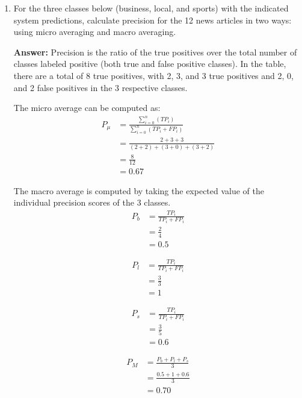 \documentclass[11pt]{article}
\begin{document}
\begin{enumerate}
\begin{enumerate}
          \item For the three classes below (business, local, and sports) with the indicated system predictions, calculate precision for the 12 news articles in two ways: using micro averaging and macro averaging.

                \textbf{Answer:} Precision is the ratio of the true positives over the total number of classes labeled positive (both true and false positive classes). In the table, there are a total of 8 true positives, with 2, 3, and 3 true positives and 2, 0, and 2 false positives in the 3 respective classes.

                The micro average can be computed as:
                \begin{align*}
                  P_{\mu} & = \frac{\sum_{i=0}^{n}(TP_i)}{\sum_{i=0}^{n}(TP_i+FP_i)} \\
                          & = \frac{2+3+3}{(2+2)+(3+0)+(3+2)}                        \\
                          & = \frac{8}{12}                                           \\
                          & = 0.67
                \end{align*}

                The macro average is computed by taking the expected value of the individual precision scores of the 3 classes.
                \begin{align*}
                  P_{b} & = \frac{TP_i}{TP_i+FP_i} \\
                        & = \frac{2}{4}            \\
                        & = 0.5
                \end{align*}

                \begin{align*}
                  P_{l} & = \frac{TP_i}{TP_i+FP_i} \\
                        & = \frac{3}{3}            \\
                        & = 1
                \end{align*}

                \begin{align*}
                  P_{s} & = \frac{TP_i}{TP_i+FP_i} \\
                        & = \frac{3}{5}            \\
                        & = 0.6
                \end{align*}

                \begin{align*}
                  P_{M} & = \frac{P_{b}+P_{l}+P_{s}}{3} \\
                        & = \frac{0.5+1+0.6}{3}         \\
                        & = 0.70
                \end{align*}

        \end{enumerate}


\end{enumerate}
\end{document}
